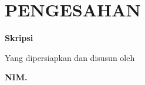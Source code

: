 \chapter*{PENGESAHAN}

\begin{center}
  {\bfseries Skripsi\par}
  \vspace{0.4em}
  {\bfseries\MakeUppercase{\JudulSkripsi}\par}
  {\JudulStudiKasus\par}
\end{center}

\begin{center}
  Yang dipersiapkan dan disusun oleh
\end{center}

\begin{center}
  {\bfseries \NamaMahasiswa\par}
  {\bfseries NIM. \NIM\par}
\end{center}

